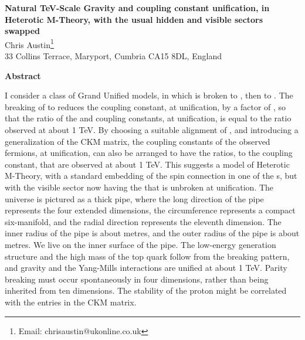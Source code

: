 \documentclass[a4paper,12pt,oneside]{article}
\begin{document}
\begin{center}
{\large\bf Natural TeV-Scale Gravity and coupling constant
unification, in Heterotic M-Theory, with the usual hidden and
visible sectors swapped\\}
\vspace{0.14cm}
\vspace*{.05in}
{Chris Austin\footnote{Email: chrisaustin@ukonline.co.uk}\\
\small 33 Collins Terrace, Maryport, Cumbria CA15 8DL, England\\
}
\end{center}
\begin{center}
{\bf Abstract}
\end{center}
\noindent I consider a class of Grand Unified models, in which 
\coordHE{} is
broken to \coordHE{} 
\coordHE{}, then 
to \coordHE{}.  The 
breaking of \coordHE{} to 
\coordHE{} reduces the \coordHE{} coupling
constant, at unification, by a factor of \coordHE{}, so that the 
ratio of the
\coordHE{} and \coordHE{} coupling constants, at
unification, is equal to the ratio observed at about 1 TeV.  By 
choosing a suitable alignment of \coordHE{}, and introducing
a generalization of the CKM matrix, the
\coordHE{} coupling constants of the observed fermions, at
unification, can also be arranged to have the ratios, to the 
\coordHE{} coupling constant, that are observed at about
1 TeV.  This 
suggests a model of Heterotic M-Theory, with a standard embedding of
the spin connection in one of the \coordHE{}s, but with the 
visible sector now having the \coordHE{} that is unbroken at 
unification.  The universe is pictured 
as a thick pipe, where the long direction of the pipe represents 
the four extended dimensions, the circumference represents a 
compact six-manifold, and the radial direction represents the 
eleventh 
dimension.  The inner radius of the pipe is about \coordHE{} 
metres, and the outer radius of the pipe is about \coordHE{} 
metres.  We live on the inner surface of the pipe.  The low-energy 
generation structure and the high mass of the top quark follow from
the breaking pattern, and gravity and the Yang-Mills interactions 
are unified at about 1 TeV.  Parity breaking must
occur spontaneously in four dimensions, rather than being inherited
from ten dimensions.  The stability of the proton might be 
correlated with the entries in the CKM matrix.
\end{document}
